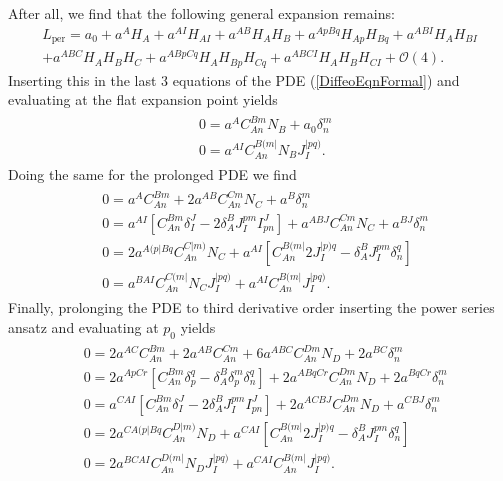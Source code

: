 After all, we find that the following general expansion remains: 
\begin{multline}\label{LperRed}
     L_{\text{per}} = a_0 + a^A H_A + a^{AI}H_{AI} + a^{AB} H_{A}H_{B} + a^{ApBq} H_{Ap}H_{Bq} + a^{ABI} H_{A} H_{BI} \\
    + a^{ABC} H_A H_B H_C + a^{ABpCq} H_{A}H_{Bp}H_{Cq}
    + a^{ABCI} H_A H_B H_{CI} 
    + \mathcal{O}(4).
\end{multline}
Inserting this in the last 3 equations of the PDE (\ref{DiffeoEqnFormal}) and evaluating at the flat expansion point yields
\begin{align}\label{order1}
    \begin{aligned}
    &0 = a^A C_{An}^{Bm}N_B + a_0 \delta^m_n\\
    &0 = a^{AI}C_{An}^{B(m\vert }N_B J^{\vert pq)}_I.
    \end{aligned}
\end{align}
Doing the same for the prolonged PDE we find
\begin{align}\label{order2}
    \begin{aligned}
    &0 = a^A C_{An}^{Bm} + 2 a^{AB}C_{An}^{Cm}N_C + a^B\delta^m_n\\
    &0 = a^{AI}\left [C_{An}^{Bm}\delta^J _I- 2 \delta^B_A J_I^{pm}I^J_{pn} \right ] + a^{ABJ}C_{An}^{Cm}N_C + a^{BJ} \delta^m_n \\
    &0 = 2a^{A(p\vert Bq}C_{An}^{C\vert m)}N_C + a^{AI} \left [C_{An}^{B(m\vert} 2 J_{I}^{\vert p)q} - \delta_A^BJ_I^{pm}\delta^q_n \right ]\\
    &0 = a^{BAI}C_{An}^{C(m\vert}N_CJ_I^{\vert pq)} + a^{AI}C_{An}^{B(m \vert} J_I^{\vert pq)}.
    \end{aligned}
\end{align}
Finally, prolonging the PDE to third derivative order inserting the power series ansatz and evaluating at $p_0$ yields
\begin{align}\label{order3}
\begin{aligned}
&0 = 2 a^{AC}C_{An}^{Bm} + 2a^{AB}C_{An}^{Cm} + 6 a^{ABC}C_{An}^{Dm} N_D + 2a^{BC} \delta^m_n\\
&0 = 2 a^{ApCr} \left [ C_{An}^{Bm} \delta ^q_p - \delta^B_A \delta^m_p \delta^q_n \right ] +2 a^{A Bq Cr} C_{An}^{Dm} N_D + 2 a^{BqCr} \delta^m_n\\
&0 = a^{CAI} \left [C_{An}^{Bm}\delta^J _I- 2 \delta^B_A J_I^{pm}I^J_{pn} \right ] + 2 a^{ACBJ} C_{An}^{Dm} N_D + a^{CBJ} \delta ^m _n \\
&0 = 2 a^{C A(p \vert B q} C_{An}^{D \vert m )} N_D + a^{CAI} \left [C_{An}^{B(m\vert} 2 J_{I}^{\vert p)q} - \delta_A^BJ_I^{pm}\delta^q_n \right ]\\
&0 = 2 a^{BCAI}C_{An}^{D(m\vert}N_DJ_I^{\vert pq)} + a^{CAI}C_{An}^{B(m \vert} J_I^{\vert pq)}.
\end{aligned}
\end{align}

